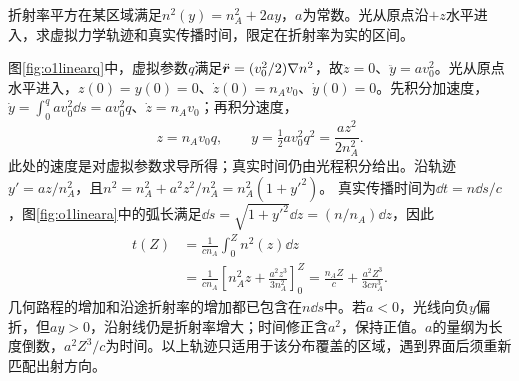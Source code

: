 \begin{example}\label{ex:o1linearn2}
折射率平方在某区域满足$n^2(y)=n_A^2+2ay$，$a$为常数。光从原点沿$+z$水平进入，求虚拟力学轨迹和真实传播时间，限定在折射率为实的区间。
\end{example}
\begin{solution}
图\ref{fig:o1linearq}中，虚拟参数$q$满足$\ddot{\bm{r}}=(v_0^2/2)\nabla n^2$，故$\ddot z=0$、$\ddot y=av_0^2$。光从原点水平进入，$z(0)=y(0)=0$、$\dot z(0)=n_Av_0$、$\dot y(0)=0$。先积分加速度，$\dot y=\int_0^qav_0^2\dd s=av_0^2q$、$\dot z=n_Av_0$；再积分速度，
\[
 z=n_Av_0q,\qquad y=\tfrac12av_0^2q^2
 =\frac{az^2}{2n_A^2}.
\]
此处的速度是对虚拟参数求导所得；真实时间仍由光程积分给出。沿轨迹$y'=az/n_A^2$，且$n^2=n_A^2+a^2z^2/n_A^2=n_A^2(1+y'^2)$。
真实传播时间为$\dd t=n\dd s/c$，图\ref{fig:o1lineara}中的弧长满足$\dd s=\sqrt{1+y'^2}\dd z=(n/n_A)\dd z$，因此
\begin{align*}
 t(Z)&=\frac1{cn_A}\int_0^Z n^2(z)\dd z\\
 &=\frac1{cn_A}\left[n_A^2z+\frac{a^2z^3}{3n_A^2}\right]_0^Z
 =\frac{n_AZ}c+\frac{a^2Z^3}{3cn_A^3}.
\end{align*}
几何路程的增加和沿途折射率的增加都已包含在$n\dd s$中。若$a<0$，光线向负$y$偏折，但$a y>0$，沿射线仍是折射率增大；时间修正含$a^2$，保持正值。$a$的量纲为长度倒数，$a^2Z^3/c$为时间。以上轨迹只适用于该分布覆盖的区域，遇到界面后须重新匹配出射方向。
\end{solution}

